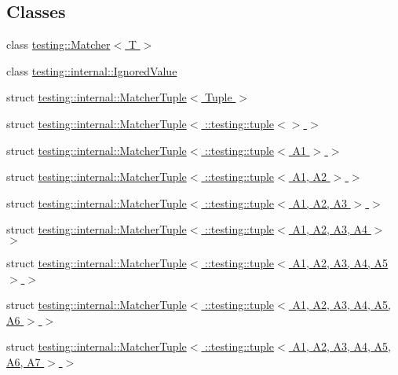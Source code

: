 \subsection*{Classes}
\begin{DoxyCompactItemize}
\item 
class \hyperlink{classtesting_1_1_matcher}{testing\+::\+Matcher$<$ T $>$}
\item 
class \hyperlink{classtesting_1_1internal_1_1_ignored_value}{testing\+::internal\+::\+Ignored\+Value}
\item 
struct \hyperlink{structtesting_1_1internal_1_1_matcher_tuple}{testing\+::internal\+::\+Matcher\+Tuple$<$ Tuple $>$}
\item 
struct \hyperlink{structtesting_1_1internal_1_1_matcher_tuple_3_01_1_1testing_1_1tuple_3_4_01_4}{testing\+::internal\+::\+Matcher\+Tuple$<$ \+::testing\+::tuple$<$$>$ $>$}
\item 
struct \hyperlink{structtesting_1_1internal_1_1_matcher_tuple_3_01_1_1testing_1_1tuple_3_01_a1_01_4_01_4}{testing\+::internal\+::\+Matcher\+Tuple$<$ \+::testing\+::tuple$<$ A1 $>$ $>$}
\item 
struct \hyperlink{structtesting_1_1internal_1_1_matcher_tuple_3_01_1_1testing_1_1tuple_3_01_a1_00_01_a2_01_4_01_4}{testing\+::internal\+::\+Matcher\+Tuple$<$ \+::testing\+::tuple$<$ A1, A2 $>$ $>$}
\item 
struct \hyperlink{structtesting_1_1internal_1_1_matcher_tuple_3_01_1_1testing_1_1tuple_3_01_a1_00_01_a2_00_01_a3_01_4_01_4}{testing\+::internal\+::\+Matcher\+Tuple$<$ \+::testing\+::tuple$<$ A1, A2, A3 $>$ $>$}
\item 
struct \hyperlink{structtesting_1_1internal_1_1_matcher_tuple_3_01_1_1testing_1_1tuple_3_01_a1_00_01_a2_00_01_a3_00_01_a4_01_4_01_4}{testing\+::internal\+::\+Matcher\+Tuple$<$ \+::testing\+::tuple$<$ A1, A2, A3, A4 $>$ $>$}
\item 
struct \hyperlink{structtesting_1_1internal_1_1_matcher_tuple_3_01_1_1testing_1_1tuple_3_01_a1_00_01_a2_00_01_a3_00_01_a4_00_01_a5_01_4_01_4}{testing\+::internal\+::\+Matcher\+Tuple$<$ \+::testing\+::tuple$<$ A1, A2, A3, A4, A5 $>$ $>$}
\item 
struct \hyperlink{structtesting_1_1internal_1_1_matcher_tuple_3_01_1_1testing_1_1tuple_3_01_a1_00_01_a2_00_01_a3_0fb935efcf1b84fbc4f177777ca3392dc}{testing\+::internal\+::\+Matcher\+Tuple$<$ \+::testing\+::tuple$<$ A1, A2, A3, A4, A5, A6 $>$ $>$}
\item 
struct \hyperlink{structtesting_1_1internal_1_1_matcher_tuple_3_01_1_1testing_1_1tuple_3_01_a1_00_01_a2_00_01_a3_0064798126035aa0d3ca935c3449bf0c1}{testing\+::internal\+::\+Matcher\+Tuple$<$ \+::testing\+::tuple$<$ A1, A2, A3, A4, A5, A6, A7 $>$ $>$}

\end{DoxyCompactItemize}

